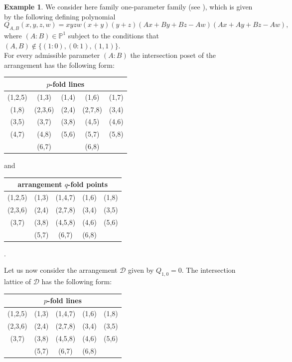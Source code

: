\documentclass[11pt]{article}
\theoremstyle{plain}
\theoremstyle{definition}
\newtheorem{example}[thm]{Example}
\begin{document}
\begin{example}
We consider here family one-parameter family  (see \cite[p. 23]{Cynks}), which is given by the following defining polynomial
\begin{equation}
Q_{A,B}(x,y,z,w)=xyzw(x+y)(y+z)(Ax+By+Bz-Aw)(Ax+Ay+Bz-Aw),  
\end{equation}
where $(A:B) \in \mathbb{P}^{1}$ subject to the conditions that $(A,B) \not\in\{(1:0),(0:1),(1,1)\}$.\\
For every admissible parameter $(A:B)$ the intersection poset of the arrangement has the following form:
\begin{center}
\begin{tabular}{ c c c c c  }
\multicolumn{5}{c}{$p$-fold lines} \\\hline \hline
 (1,2,5) & (1,3) &  (1,4) & (1,6) & (1,7) \\
 (1,8) & (2,3,6) & (2,4) & (2,7,8) & (3,4) \\
 (3,5) & (3,7) & (3,8) & (4,5) & (4,6) \\
 (4,7) & (4,8) & (5,6) & (5,7) & (5,8) \\
 & (6,7) &   &(6,8) &

\end{tabular}
\end{center}
and 
\begin{center}
\begin{tabular}{ c c c c c }
\multicolumn{5}{c}{arrangement $q$-fold points} \\ \hline \hline 
 (1,2,5) & (1,3) &  (1,4,7) &  (1,6) &  (1,8) \\
 (2,3,6) & (2,4) & (2,7,8) & (3,4) & (3,5) \\
 (3,7) & (3,8) & (4,5,8) & (4,6) &  (5,6) \\
 & (5,7) &   (6,7) &  (6,8)
\end{tabular}.
\end{center}
Let us now consider the arrangement $\mathcal{D}$ given by $Q_{1,0} = 0$. The intersection lattice of $\mathcal{D}$ has the following form:
\begin{center}
\begin{tabular}{ c c c c c  }
\multicolumn{5}{c}{$p$-fold lines} \\\hline \hline
 (1,2,5) & (1,3) & (1,4,7) & (1,6) & (1,8) \\
 (2,3,6) & (2,4) & (2,7,8) & (3,4) & (3,5) \\
 (3,7) & (3,8) & (4,5,8) & (4,6) & (5,6) \\
 & (5,7) & (6,7) & (6,8) &



\end{tabular}
\end{center}
\end{example}
\end{document}
